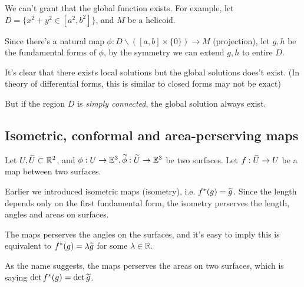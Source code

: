 \begin{example}
    We can't grant that the global function exists.
	For example, let $D = \{x^2+y^2\in [a^2, b^2]\}$,
	and $M$ be a helicoid.

	Since there's a natural map
	$\phi: D\backslash([a,b]\times \{0\})\to M$ (projection),
	let $g, h$ be the fundamental forms of $\phi$,
	by the symmetry we can extend  $g,h$ to entire $D$.

	It's clear that there exists local solutions but
	the global solutions does't exist.
	(In theory of differential forms, this is similar to closed forms may
	not be exact)

	But if the region $D$ is \textit{simply connected},
	the global solution always exist.
\end{example}
\subsection{Isometric, conformal and area-perserving maps}
\label{sub:Isometric, conformal and area-perserving maps}
Let $U,\widetilde{U}\subset \mathbb{R}^2$, and $\phi: U\to \mathbb{E}^3,
\widetilde{\phi}: \widetilde{U}\to \mathbb{E}^3$ be two surfaces.
Let $f: \widetilde{U}\to U$ be a map between two surfaces.

Earlier we introduced isometric maps (isometry),
i.e. $f^*(g) = \widetilde{g}$.
Since the length depends only on the first fundamental form,
the isometry perserves the length, angles and areas on surfaces.

The  maps perserves the angles on the surfaces,
and it's easy to imply this is equivalent to $f^*(g) = \lambda \widetilde{g}$
for some $\lambda\in \mathbb{R}$.

As the name suggests, the  maps
perserves the areas on two surfaces,
which is saying $\det f^*(g) = \det \widetilde{g}$.
